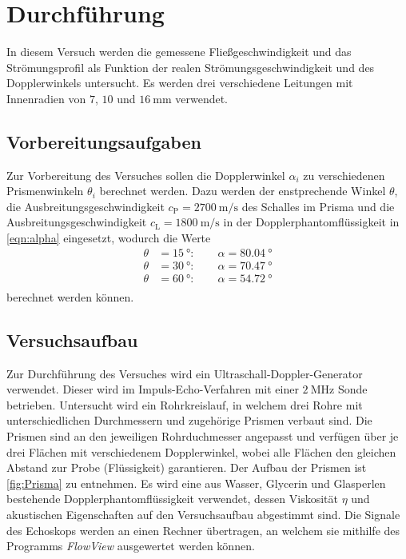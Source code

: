 \section{Durchführung}
\label{sec:Durchführung}
In diesem Versuch werden die gemessene Fließgeschwindigkeit und das Strömungsprofil als Funktion der realen Strömungsgeschwindigkeit und des Dopplerwinkels untersucht. 
Es werden drei verschiedene Leitungen mit Innenradien von $7$, $10$ und $\qty{16}{\milli\metre}$ verwendet. 

\subsection{Vorbereitungsaufgaben}
\label{subsec:Vorbereitung}
Zur Vorbereitung des Versuches sollen die Dopplerwinkel $\alpha_i$ zu verschiedenen Prismenwinkeln $\theta_i$ berechnet werden. Dazu werden der enstprechende Winkel
$\theta$, die Ausbreitungsgeschwindigkeit $c_\text{P} = \qty{2700}{\metre\per\second}$ des Schalles im Prisma und die Ausbreitungsgeschwindigkeit
$c_\text{L} = \qty{1800}{\metre\per\second}$ in der Dopplerphantomflüssigkeit in \autoref{eqn:alpha} eingesetzt, wodurch die Werte
\begin{align*}
    \theta &= \qty{15}{\degree}: \qquad \alpha = \qty{80.04}{\degree} \\
    \theta &= \qty{30}{\degree}: \qquad \alpha = \qty{70.47}{\degree} \\
    \theta &= \qty{60}{\degree}: \qquad \alpha = \qty{54.72}{\degree} \\
\end{align*} 
berechnet werden können.

\subsection{Versuchsaufbau}
\label{subsec:Aufbau}
Zur Durchführung des Versuches wird ein Ultraschall-Doppler-Generator verwendet. Dieser wird im Impuls-Echo-Verfahren mit einer $\qty{2}{\mega\hertz}$ Sonde betrieben.
Untersucht wird ein Rohrkreislauf, in welchem drei Rohre mit unterschiedlichen Durchmessern und zugehörige Prismen verbaut sind. Die Prismen sind an den jeweiligen
Rohrduchmesser angepasst und verfügen über je drei Flächen mit verschiedenem Dopplerwinkel, wobei alle Flächen den gleichen Abstand zur Probe (Flüssigkeit) garantieren.  
Der Aufbau der Prismen ist \autoref{fig:Prisma} zu entnehmen. Es wird eine aus Wasser, Glycerin und
Glasperlen bestehende Dopplerphantomflüssigkeit verwendet, dessen Viskosität $\eta$ und akustischen Eigenschaften auf den Versuchsaufbau abgestimmt sind.
Die Signale des Echoskops werden an einen Rechner übertragen, an welchem sie mithilfe des Programms \textit{FlowView} ausgewertet werden können.

